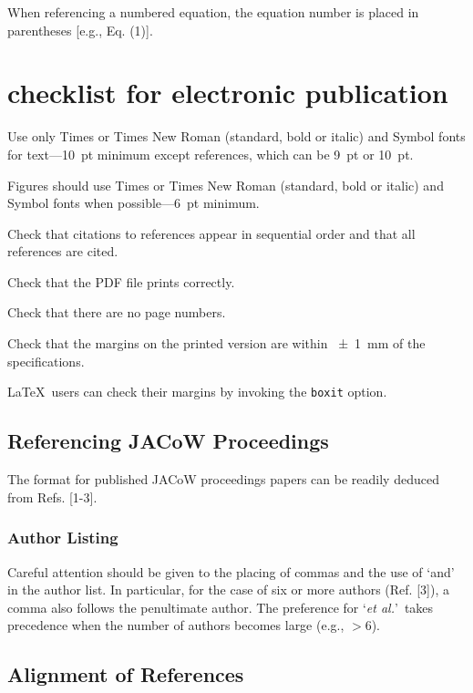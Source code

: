 \documentclass[letterpaper,  %
              ]{jacow-2_3}   %
\begin{document}
When referencing a numbered equation, the equation number is placed
in parentheses [e.g., Eq. (1)].

\section{checklist for electronic publication}

\begin{Itemize}
	\item  Use only Times or Times New Roman (standard, bold or italic) and Symbol
	fonts for text---\SI{10}{pt} minimum except references, which can be \SI{9}{pt} or \SI{10}{pt}.
	\item  Figures should use Times or Times New Roman (standard, bold or italic) and
	Symbol fonts when possible---\SI{6}{pt} minimum.
	\item  Check that citations to references appear in sequential order and
	that all references are cited.
	\item  Check that the PDF file prints correctly.
	\item  Check that there are no page numbers.
	\item  Check that the margins on the printed version are within \SI{\pm1}{mm}
	of the specifications.
	\item  \LaTeX\ users can check their margins by invoking the
	\texttt{boxit} option.
\end{Itemize}

\subsection{Referencing JACoW Proceedings}

The format for published JACoW proceedings papers
can be readily deduced from Refs. [1-3].

\subsubsection{Author Listing} Careful attention should be given to the
placing of commas and the use of ‘and’ in the author list.
In particular, for the case of six or more authors
(Ref. [3]), a comma also follows the penultimate author.
The preference for ‘\emph{et al.}’\ takes precedence when the number
of authors becomes large (e.g., $>$6).

\subsection{Alignment of References}
\end{document}
